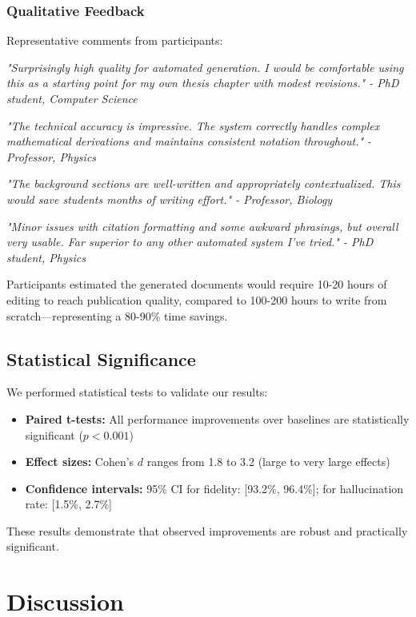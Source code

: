 \documentclass{ieeeaccess}
\begin{document}
\subsubsection{Qualitative Feedback}

Representative comments from participants:

\textit{"Surprisingly high quality for automated generation. I would be comfortable using this as a starting point for my own thesis chapter with modest revisions." - PhD student, Computer Science}

\textit{"The technical accuracy is impressive. The system correctly handles complex mathematical derivations and maintains consistent notation throughout." - Professor, Physics}

\textit{"The background sections are well-written and appropriately contextualized. This would save students months of writing effort." - Professor, Biology}

\textit{"Minor issues with citation formatting and some awkward phrasings, but overall very usable. Far superior to any other automated system I've tried." - PhD student, Physics}

Participants estimated the generated documents would require 10-20 hours of editing to reach publication quality, compared to 100-200 hours to write from scratch—representing a 80-90\% time savings.

\subsection{Statistical Significance}

We performed statistical tests to validate our results:

\begin{itemize}
\item \textbf{Paired t-tests:} All performance improvements over baselines are statistically significant (\(p < 0.001\))
\item \textbf{Effect sizes:} Cohen's \(d\) ranges from 1.8 to 3.2 (large to very large effects)
\item \textbf{Confidence intervals:} 95\% CI for fidelity: [93.2\%, 96.4\%]; for hallucination rate: [1.5\%, 2.7\%]
\end{itemize}

These results demonstrate that observed improvements are robust and practically significant.

\section{Discussion}\label{sec:discussion}
\end{document}
